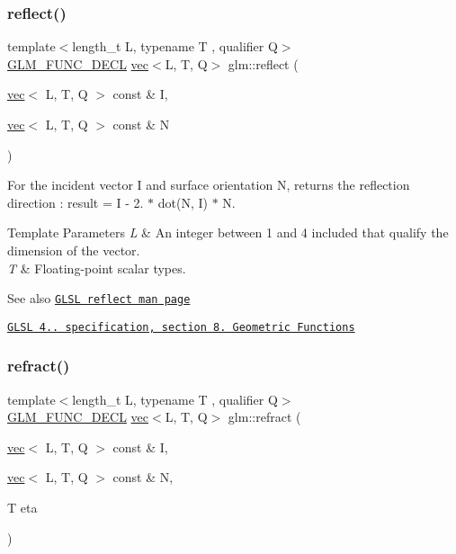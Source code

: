 \subsubsection{\texorpdfstring{reflect()}{reflect()}}
{\footnotesize\ttfamily template$<$length\+\_\+t L, typename T , qualifier Q$>$ \\
\mbox{\hyperlink{setup_8hpp_ab2d052de21a70539923e9bcbf6e83a51}{G\+L\+M\+\_\+\+F\+U\+N\+C\+\_\+\+D\+E\+CL}} \mbox{\hyperlink{structglm_1_1vec}{vec}}$<$L, T, Q$>$ glm\+::reflect (\begin{DoxyParamCaption}\item[{\mbox{\hyperlink{structglm_1_1vec}{vec}}$<$ L, T, Q $>$ const \&}]{I,  }\item[{\mbox{\hyperlink{structglm_1_1vec}{vec}}$<$ L, T, Q $>$ const \&}]{N }\end{DoxyParamCaption})}

For the incident vector I and surface orientation N, returns the reflection direction \+: result = I -\/ 2. $\ast$ dot(\+N, I) $\ast$ N.


\begin{DoxyTemplParams}{Template Parameters}
{\em L} & An integer between 1 and 4 included that qualify the dimension of the vector. \\
\hline
{\em T} & Floating-\/point scalar types.\\
\hline
\end{DoxyTemplParams}
\begin{DoxySeeAlso}{See also}
\href{http://www.opengl.org/sdk/docs/manglsl/xhtml/reflect.xml}{\tt G\+L\+SL reflect man page} 

\href{http://www.opengl.org/registry/doc/GLSLangSpec.4.20.8.pdf}{\tt G\+L\+SL 4.. specification, section 8. Geometric Functions} 
\end{DoxySeeAlso}
\mbox{\label{group__core__func__geometric_ga01da3dff9e2ef6b9d4915c3047e22b74}} 
\subsubsection{\texorpdfstring{refract()}{refract()}}
{\footnotesize\ttfamily template$<$length\+\_\+t L, typename T , qualifier Q$>$ \\
\mbox{\hyperlink{setup_8hpp_ab2d052de21a70539923e9bcbf6e83a51}{G\+L\+M\+\_\+\+F\+U\+N\+C\+\_\+\+D\+E\+CL}} \mbox{\hyperlink{structglm_1_1vec}{vec}}$<$L, T, Q$>$ glm\+::refract (\begin{DoxyParamCaption}\item[{\mbox{\hyperlink{structglm_1_1vec}{vec}}$<$ L, T, Q $>$ const \&}]{I,  }\item[{\mbox{\hyperlink{structglm_1_1vec}{vec}}$<$ L, T, Q $>$ const \&}]{N,  }\item[{T}]{eta }\end{DoxyParamCaption})}

